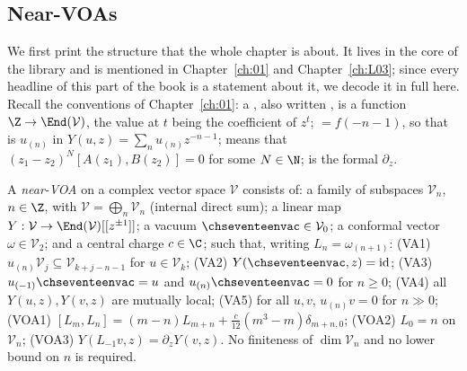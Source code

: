 \subsection{Near-VOAs}

We first print the structure that the whole chapter is about.  It lives in the core of the library and is
mentioned in Chapter~\ref{ch:01} and Chapter~\ref{ch:L03}; since every headline of this part of the book
is a statement about it, we decode it in full here.  Recall the conventions of Chapter~\ref{ch:01}: a
, also written , is a function $\Z\to\End(\mathcal V)$,
the value at $t$ being the coefficient of $z^t$;  $=f(-n-1)$, so that 
is $u_{(n)}$ in $Y(u,z)=\sum_nu_{(n)}z^{-n-1}$;  means that $(z_1-z_2)^N[A(z_1),B(z_2)]=0$
for some $N\in\N$;  is the formal $\partial_z$.

\begin{definition}\label{ch17:def:nearvoa}
A \emph{near-VOA} on a complex vector space $\mathcal V$ consists of: a family of subspaces
$\mathcal V_n$, $n\in\Z$, with $\mathcal V=\bigoplus_n\mathcal V_n$ (internal direct sum); a linear map
$Y:\mathcal V\to\End(\mathcal V)[[z^{\pm1}]]$; a vacuum $\chseventeenvac\in\mathcal V_0$; a conformal vector
$\omega\in\mathcal V_2$; and a central charge $c\in\C$; such that, writing $L_n=\omega_{(n+1)}$:
(VA1) $u_{(n)}\mathcal V_j\subseteq\mathcal V_{k+j-n-1}$ for $u\in\mathcal V_k$;
(VA2) $Y(\chseventeenvac,z)=\mathrm{id}$;
(VA3) $u_{(-1)}\chseventeenvac=u$ and $u_{(n)}\chseventeenvac=0$ for $n\ge0$;
(VA4) all $Y(u,z),Y(v,z)$ are mutually local;
(VA5) for all $u,v$, $u_{(n)}v=0$ for $n\gg0$;
(VOA1) $[L_m,L_n]=(m-n)L_{m+n}+\tfrac{c}{12}(m^3-m)\delta_{m+n,0}$;
(VOA2) $L_0=n$ on $\mathcal V_n$;
(VOA3) $Y(L_{-1}v,z)=\partial_zY(v,z)$.
No finiteness of $\dim\mathcal V_n$ and no lower bound on $n$ is required.
\end{definition}

